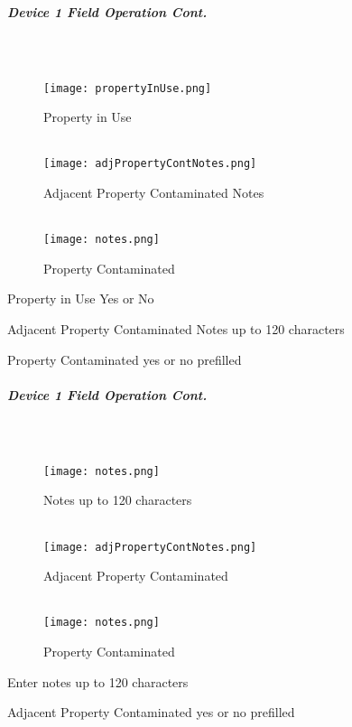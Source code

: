 \documentclass[class=article , crop=false, titlepage, twoside, multi={itemize, figure, verbatim}, float=false]{standalone}
\begin{document}
\clearpage
\subparagraph*{Device 1 Field Operation Cont.}
\subparagraph*{\\}
\begin{wrapfigure}{r}{0.5\textwidth}
\centering
\texttt{[image: propertyInUse.png]}
\caption {Property in Use}
\vspace{.2in}
\HRule \\[.4cm] %
\vspace{.2in}
\texttt{[image: adjPropertyContNotes.png]}
\caption{Adjacent Property Contaminated Notes}
\vspace{.2in}
\HRule \\[.4cm] %
\vspace{.2in}
\texttt{[image: notes.png]}
\caption{Property Contaminated}
\end{wrapfigure}
Property in Use Yes or No\\
\vspace{2in}

\noindent Adjacent Property Contaminated Notes up to 120 characters\\
\vspace{2in}

\noindent Property Contaminated yes or no prefilled\\

\clearpage
\subparagraph*{Device 1 Field Operation Cont.}
\subparagraph*{\\}
\begin{wrapfigure}{r}{0.5\textwidth}
\centering
\texttt{[image: notes.png]}
\caption {Notes up to 120 characters}
\vspace{.2in}
\HRule \\[.4cm] %
\vspace{.2in}
\texttt{[image: adjPropertyContNotes.png]}
\caption{Adjacent Property Contaminated}
\vspace{.2in}
\HRule \\[.4cm] %
\vspace{.2in}
\texttt{[image: notes.png]}
\caption{Property Contaminated}
\end{wrapfigure}
Enter notes up to 120 characters\\
\vspace{2in}

\noindent Adjacent Property Contaminated yes or no prefilled\\
\vspace{2in}
\end{document}
